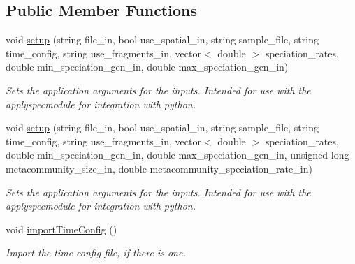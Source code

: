 \subsection*{Public Member Functions}
\begin{DoxyCompactItemize}
\item 
void \hyperlink{struct_spec_sim_parameters_ad2b6362214ce80114e602ee04413fc56}{setup} (string file\+\_\+in, bool use\+\_\+spatial\+\_\+in, string sample\+\_\+file, string time\+\_\+config, string use\+\_\+fragments\+\_\+in, vector$<$ double $>$ speciation\+\_\+rates, double min\+\_\+speciation\+\_\+gen\+\_\+in, double max\+\_\+speciation\+\_\+gen\+\_\+in)
\begin{DoxyCompactList}\small\item\em Sets the application arguments for the inputs. Intended for use with the applyspecmodule for integration with python. \end{DoxyCompactList}\item 
void \hyperlink{struct_spec_sim_parameters_affff445e6b2dc27c00dcdb6f0779fba2}{setup} (string file\+\_\+in, bool use\+\_\+spatial\+\_\+in, string sample\+\_\+file, string time\+\_\+config, string use\+\_\+fragments\+\_\+in, vector$<$ double $>$ speciation\+\_\+rates, double min\+\_\+speciation\+\_\+gen\+\_\+in, double max\+\_\+speciation\+\_\+gen\+\_\+in, unsigned long metacommunity\+\_\+size\+\_\+in, double metacommunity\+\_\+speciation\+\_\+rate\+\_\+in)
\begin{DoxyCompactList}\small\item\em Sets the application arguments for the inputs. Intended for use with the applyspecmodule for integration with python. \end{DoxyCompactList}\item 
void \hyperlink{struct_spec_sim_parameters_ae0196a50a551a821b75b6e92a35534a7}{import\+Time\+Config} ()\hypertarget{struct_spec_sim_parameters_ae0196a50a551a821b75b6e92a35534a7}{}\label{struct_spec_sim_parameters_ae0196a50a551a821b75b6e92a35534a7}

\begin{DoxyCompactList}\small\item\em Import the time config file, if there is one. \end{DoxyCompactList}\end{DoxyCompactItemize}

